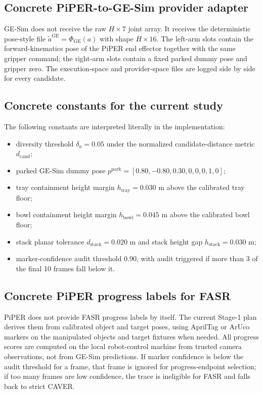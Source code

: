 \documentclass[10pt]{article}
\theoremstyle{plain}
\theoremstyle{definition}
\theoremstyle{remark}
\begin{document}
\subsection{Concrete PiPER-to-GE-Sim provider adapter}
GE-Sim does not receive the raw $H\times 7$ joint array. It receives the deterministic pose-style file $\tilde a^{\mathrm{GE}}=\Phi_{\mathrm{GE}}(a)$ with shape $H\times 16$. The left-arm slots contain the forward-kinematics pose of the PiPER end effector together with the same gripper command; the right-arm slots contain a fixed parked dummy pose and gripper zero. The execution-space and provider-space files are logged side by side for every candidate.

\subsection{Concrete constants for the current study}
The following constants are interpreted literally in the implementation:
\begin{itemize}
    \item diversity threshold $\delta_a=0.05$ under the normalized candidate-distance metric $d_{\mathrm{cand}}$;
    \item parked GE-Sim dummy pose $p^{\mathrm{park}}=[0.80,-0.80,0.30,0,0,0,1,0]$;
    \item tray containment height margin $h_{\mathrm{tray}}=0.030$ m above the calibrated tray floor;
    \item bowl containment height margin $h_{\mathrm{bowl}}=0.045$ m above the calibrated bowl floor;
    \item stack planar tolerance $d_{\mathrm{stack}}=0.020$ m and stack height gap $h_{\mathrm{stack}}=0.030$ m;
    \item marker-confidence audit threshold 0.90, with audit triggered if more than 3 of the final 10 frames fall below it.
\end{itemize}

\subsection{Concrete PiPER progress labels for FASR}
PiPER does not provide FASR progress labels by itself. The current Stage-1 plan derives them from calibrated object and target poses, using AprilTag or ArUco markers on the manipulated objects and target fixtures when needed. All progress scores are computed on the local robot-control machine from trusted camera observations, not from GE-Sim predictions. If marker confidence is below the audit threshold for a frame, that frame is ignored for progress-endpoint selection; if too many frames are low confidence, the trace is ineligible for FASR and falls back to strict CAVER.
\end{document}
